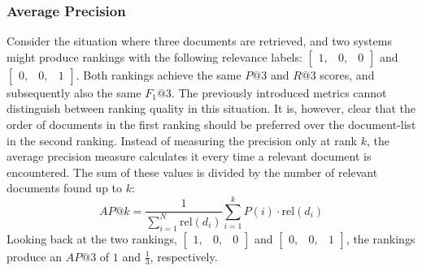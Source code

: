 \subsubsection{Average Precision}
Consider the situation where three documents are retrieved, and two systems might produce rankings with the following relevance labels: $\left[
\begin{smallmatrix}
	1, & 0, & 0
\end{smallmatrix}
\right]$ and $\left[
\begin{smallmatrix}
	0, & 0, & 1
\end{smallmatrix}
\right]$.
Both rankings achieve the same $P@3$ and $R@3$ scores, and subsequently also the same $F_1@3$. The previously introduced metrics cannot distinguish between ranking quality in this situation. It is, however, clear that the order of documents in the first ranking should be preferred over the document-list in the second ranking. 
Instead of measuring the precision only at rank $k$, the average precision measure calculates it every time a relevant document is encountered. The sum of these values is divided by the number of relevant documents found up to $k$:
\begin{equation}
	\textit{AP}@k = \frac{1}{\sum_{i=1}^N\text{rel}\left(d_i\right)}\sum^k_{i=1} P\left(i\right) \cdot \text{rel}\left(d_i\right)
\end{equation}
Looking back at the two rankings, 
$\left[
\begin{smallmatrix}
	1, & 0, & 0
\end{smallmatrix}
\right]$ and $\left[
\begin{smallmatrix}
	0, & 0, & 1
\end{smallmatrix}
\right]$, the rankings produce an $\textit{AP}@3$ of $1$ and $\frac{1}{3}$, respectively.

